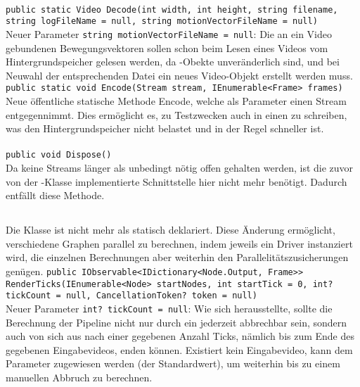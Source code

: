 \paragraph{}
\begin{itemize}
	\add \verb!public static Video Decode(int width, int height, string filename, string logFileName = null, string motionVectorFileName = null)! \\
	Neuer Parameter \verb!string motionVectorFileName = null!: Die an ein Video gebundenen Bewegungsvektoren sollen schon beim Lesen eines Videos vom Hintergrundspeicher gelesen werden, da -Obekte unveränderlich sind, und bei Neuwahl der entsprechenden Datei ein neues Video-Objekt erstellt werden muss.
	\add \verb!public static void Encode(Stream stream, IEnumerable<Frame> frames)! \\
	Neue öffentliche statische Methode Encode, welche als Parameter einen Stream entgegennimmt. Dies ermöglicht es, zu Testzwecken auch in einen  zu schreiben, was den Hintergrundspeicher nicht belastet und in der Regel schneller ist.
\end{itemize}

\paragraph{}
\begin{itemize}
	\remove \verb!public void Dispose()! \\
	Da keine Streams länger als unbedingt nötig offen gehalten werden, ist die zuvor von der -Klasse implementierte Schnittstelle  hier nicht mehr benötigt. Dadurch entfällt diese Methode.
\end{itemize}


\subsection{}

\paragraph{}
\begin{itemize}
	\change Die Klasse ist nicht mehr als statisch deklariert. Diese Änderung ermöglicht, verschiedene Graphen parallel zu berechnen, indem jeweils ein Driver instanziert wird, die einzelnen Berechnungen aber weiterhin den Parallelitätszusicherungen genügen.
	\add \verb!public IObservable<IDictionary<Node.Output, Frame>> RenderTicks(IEnumerable<Node> startNodes, int startTick = 0, int? tickCount = null, CancellationToken? token = null)! \\
	Neuer Parameter \verb!int? tickCount = null!: Wie sich herausstellte, sollte die Berechnung der Pipeline nicht nur durch ein  jederzeit abbrechbar sein, sondern auch von sich aus nach einer gegebenen Anzahl Ticks, nämlich bis zum Ende des gegebenen Eingabevideos, enden können. Existiert kein Eingabevideo, kann dem Parameter  zugewiesen werden (der Standardwert), um weiterhin bis zu einem manuellen Abbruch zu berechnen.
\end{itemize}

